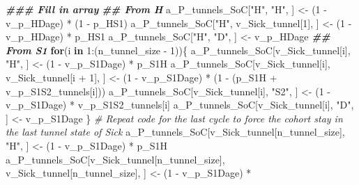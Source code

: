 \documentclass[
]{article}
\newenvironment{Shaded}{\begin{snugshade}}{\end{snugshade}}
\newcommand{\CommentTok}[1]{\textcolor[rgb]{0.56,0.35,0.01}{\textit{#1}}}
\newcommand{\ControlFlowTok}[1]{\textcolor[rgb]{0.13,0.29,0.53}{\textbf{#1}}}
\newcommand{\DecValTok}[1]{\textcolor[rgb]{0.00,0.00,0.81}{#1}}
\newcommand{\DocumentationTok}[1]{\textcolor[rgb]{0.56,0.35,0.01}{\textbf{\textit{#1}}}}
\newcommand{\NormalTok}[1]{#1}
\newcommand{\OtherTok}[1]{\textcolor[rgb]{0.56,0.35,0.01}{#1}}
\newcommand{\SpecialCharTok}[1]{\textcolor[rgb]{0.00,0.00,0.00}{#1}}
\newcommand{\StringTok}[1]{\textcolor[rgb]{0.31,0.60,0.02}{#1}}
\begin{document}
\begin{Shaded}
\begin{Highlighting}[]
\DocumentationTok{\#\#\# Fill in array}
\DocumentationTok{\#\# From H}
\NormalTok{a\_P\_tunnels\_SoC[}\StringTok{"H"}\NormalTok{, }\StringTok{"H"}\NormalTok{, ]              }\OtherTok{\textless{}{-}}\NormalTok{ (}\DecValTok{1} \SpecialCharTok{{-}}\NormalTok{ v\_p\_HDage) }\SpecialCharTok{*}\NormalTok{ (}\DecValTok{1} \SpecialCharTok{{-}}\NormalTok{ p\_HS1)}
\NormalTok{a\_P\_tunnels\_SoC[}\StringTok{"H"}\NormalTok{, v\_Sick\_tunnel[}\DecValTok{1}\NormalTok{], ] }\OtherTok{\textless{}{-}}\NormalTok{ (}\DecValTok{1} \SpecialCharTok{{-}}\NormalTok{ v\_p\_HDage) }\SpecialCharTok{*}\NormalTok{ p\_HS1}
\NormalTok{a\_P\_tunnels\_SoC[}\StringTok{"H"}\NormalTok{, }\StringTok{"D"}\NormalTok{, ]              }\OtherTok{\textless{}{-}}\NormalTok{ v\_p\_HDage}
\DocumentationTok{\#\# From S1}
\ControlFlowTok{for}\NormalTok{(i }\ControlFlowTok{in} \DecValTok{1}\SpecialCharTok{:}\NormalTok{(n\_tunnel\_size }\SpecialCharTok{{-}} \DecValTok{1}\NormalTok{))\{}
\NormalTok{  a\_P\_tunnels\_SoC[v\_Sick\_tunnel[i], }\StringTok{"H"}\NormalTok{, ]  }\OtherTok{\textless{}{-}}\NormalTok{ (}\DecValTok{1} \SpecialCharTok{{-}}\NormalTok{ v\_p\_S1Dage) }\SpecialCharTok{*}\NormalTok{ p\_S1H}
\NormalTok{  a\_P\_tunnels\_SoC[v\_Sick\_tunnel[i], }
\NormalTok{                  v\_Sick\_tunnel[i }\SpecialCharTok{+} \DecValTok{1}\NormalTok{], ]   }\OtherTok{\textless{}{-}}\NormalTok{ (}\DecValTok{1} \SpecialCharTok{{-}}\NormalTok{ v\_p\_S1Dage) }\SpecialCharTok{*}
\NormalTok{                                               (}\DecValTok{1} \SpecialCharTok{{-}}\NormalTok{ (p\_S1H }\SpecialCharTok{+}\NormalTok{ v\_p\_S1S2\_tunnels[i]))}
\NormalTok{  a\_P\_tunnels\_SoC[v\_Sick\_tunnel[i], }\StringTok{"S2"}\NormalTok{, ] }\OtherTok{\textless{}{-}}\NormalTok{ (}\DecValTok{1} \SpecialCharTok{{-}}\NormalTok{ v\_p\_S1Dage) }\SpecialCharTok{*}\NormalTok{ v\_p\_S1S2\_tunnels[i]}
\NormalTok{  a\_P\_tunnels\_SoC[v\_Sick\_tunnel[i], }\StringTok{"D"}\NormalTok{, ]  }\OtherTok{\textless{}{-}}\NormalTok{ v\_p\_S1Dage}
\NormalTok{\}}
\CommentTok{\# Repeat code for the last cycle to force the cohort stay in the last tunnel state of Sick}
\NormalTok{a\_P\_tunnels\_SoC[v\_Sick\_tunnel[n\_tunnel\_size], }\StringTok{"H"}\NormalTok{, ]  }\OtherTok{\textless{}{-}}\NormalTok{ (}\DecValTok{1} \SpecialCharTok{{-}}\NormalTok{ v\_p\_S1Dage) }\SpecialCharTok{*}\NormalTok{ p\_S1H}
\NormalTok{a\_P\_tunnels\_SoC[v\_Sick\_tunnel[n\_tunnel\_size],}
\NormalTok{                v\_Sick\_tunnel[n\_tunnel\_size], ] }\OtherTok{\textless{}{-}}\NormalTok{ (}\DecValTok{1} \SpecialCharTok{{-}}\NormalTok{ v\_p\_S1Dage) }\SpecialCharTok{*}

\end{Highlighting}
\end{Shaded}
\end{document}
